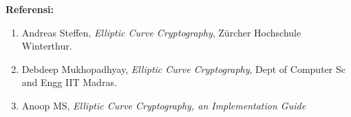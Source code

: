 \documentclass{article}
\begin{document}

\textbf{Referensi:}

\begin{enumerate}
  \item Andreas Steffen, \textit{Elliptic Curve Cryptography}, Zürcher Hochschule Winterthur.
  \item Debdeep Mukhopadhyay, \textit{Elliptic Curve Cryptography}, Dept of Computer Sc and Engg IIT Madras.
  \item Anoop MS, \textit{Elliptic Curve Cryptography, an Implementation Guide}
\end{enumerate}
\end{document}
